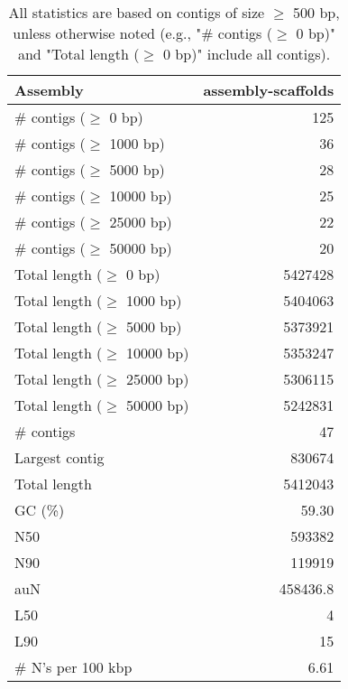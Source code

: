 \documentclass[12pt,a4paper]{article}
\begin{document}
\begin{table}[ht]
\begin{center}
\caption{All statistics are based on contigs of size $\geq$ 500 bp, unless otherwise noted (e.g., "\# contigs ($\geq$ 0 bp)" and "Total length ($\geq$ 0 bp)" include all contigs).}
\begin{tabular}{|l*{1}{|r}|}
\hline
Assembly & assembly-scaffolds \\ \hline
\# contigs ($\geq$ 0 bp) & 125 \\ \hline
\# contigs ($\geq$ 1000 bp) & 36 \\ \hline
\# contigs ($\geq$ 5000 bp) & 28 \\ \hline
\# contigs ($\geq$ 10000 bp) & 25 \\ \hline
\# contigs ($\geq$ 25000 bp) & 22 \\ \hline
\# contigs ($\geq$ 50000 bp) & 20 \\ \hline
Total length ($\geq$ 0 bp) & 5427428 \\ \hline
Total length ($\geq$ 1000 bp) & 5404063 \\ \hline
Total length ($\geq$ 5000 bp) & 5373921 \\ \hline
Total length ($\geq$ 10000 bp) & 5353247 \\ \hline
Total length ($\geq$ 25000 bp) & 5306115 \\ \hline
Total length ($\geq$ 50000 bp) & 5242831 \\ \hline
\# contigs & 47 \\ \hline
Largest contig & 830674 \\ \hline
Total length & 5412043 \\ \hline
GC (\%) & 59.30 \\ \hline
N50 & 593382 \\ \hline
N90 & 119919 \\ \hline
auN & 458436.8 \\ \hline
L50 & 4 \\ \hline
L90 & 15 \\ \hline
\# N's per 100 kbp & 6.61 \\ \hline
\end{tabular}
\end{center}
\end{table}
\end{document}
